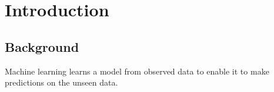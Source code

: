 \documentclass{sfuthesis}
\begin{document}
\mainmatter%

\chapter{Introduction}


\section{Background}
Machine learning learns a model from observed data to enable it to make predictions on the unseen data. 


\end{document}
